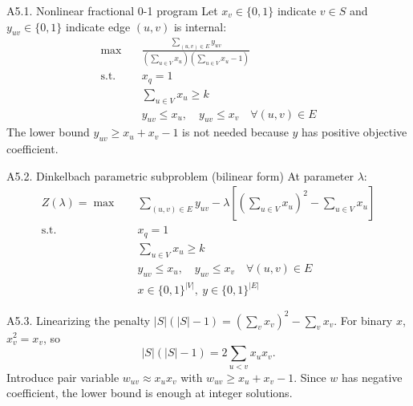 \documentclass{beamer}
\begin{document}

\begin{frame}{A5.1. Nonlinear fractional 0-1 program}
  Let $x_v \in \{0,1\}$ indicate $v \in S$ and $y_{uv} \in \{0,1\}$ indicate edge $(u,v)$ is internal:
  \begin{align*}
    \max \quad          &
    \frac{\sum_{(u,v)\in E} y_{uv}}
    {\left(\sum_{u\in V}x_u\right)\left(\sum_{u\in V}x_u - 1\right)} \\
    \mathrm{s.t.} \quad & x_q = 1 \\
                        & \sum_{u\in V} x_u \ge k \\
                        & y_{uv} \le x_u,\quad y_{uv}\le x_v \quad \forall (u,v)\in E
  \end{align*}
  The lower bound $y_{uv}\ge x_u+x_v-1$ is not needed because $y$ has positive objective coefficient.
\end{frame}

\begin{frame}{A5.2. Dinkelbach parametric subproblem (bilinear form)}
  At parameter $\lambda$:
  \begin{align*}
    Z(\lambda) = \max \quad &
    \sum_{(u,v)\in E} y_{uv} - \lambda \left[ \left(\sum_{u\in V} x_u\right)^{\!2} - \sum_{u\in V} x_u \right] \\
    \mathrm{s.t.} \quad     &
    x_q = 1                                                                                                    \\
                            & \sum_{u\in V} x_u \ge k                                                          \\
                            & y_{uv} \le x_u,\quad y_{uv} \le x_v \quad \forall (u,v) \in E                    \\
                            & x \in \{0,1\}^{|V|},\ y \in \{0,1\}^{|E|}
  \end{align*}
\end{frame}

\begin{frame}{A5.3. Linearizing the penalty}
  $|S|(|S|-1) = (\sum_v x_v)^2 - \sum_v x_v$. For binary $x$, $x_v^2 = x_v$, so
  \[
    |S|(|S|-1) = 2\sum_{u<v} x_u x_v.
  \]
  Introduce pair variable $w_{uv} \approx x_u x_v$ with $w_{uv} \ge x_u + x_v - 1$. Since $w$ has negative coefficient, the lower bound is enough at integer solutions.
\end{frame}
\end{document}
